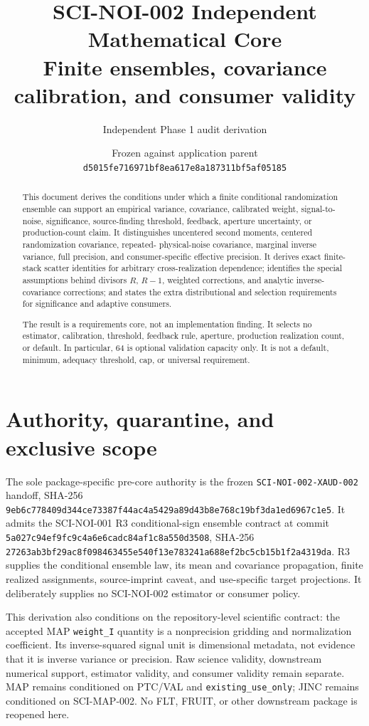 \documentclass[11pt]{article}
\title{SCI-NOI-002 Independent Mathematical Core\\
Finite ensembles, covariance calibration, and consumer validity}
\author{Independent Phase 1 audit derivation}
\date{Frozen against application parent\\
\texttt{d5015fe716971bf8ea617e8a187311bf5af05185}}
\begin{document}
\maketitle

\begin{abstract}
This document derives the conditions under which a finite conditional
randomization ensemble can support an empirical variance, covariance,
calibrated weight, signal-to-noise, significance, source-finding threshold,
feedback, aperture uncertainty, or production-count claim.  It distinguishes
uncentered second moments, centered randomization covariance, repeated-
physical-noise covariance, marginal inverse variance, full precision, and
consumer-specific effective precision.  It derives exact finite-stack scatter
identities for arbitrary cross-realization dependence; identifies the special
assumptions behind divisors $R$, $R-1$, weighted corrections, and analytic
inverse-covariance corrections; and states the extra distributional and
selection requirements for significance and adaptive consumers.

The result is a requirements core, not an implementation finding.  It selects
no estimator, calibration, threshold, feedback rule, aperture, production
realization count, or default.  In particular, 64 is optional validation
capacity only.  It is not a default, minimum, adequacy threshold, cap, or
universal requirement.
\end{abstract}

\section{Authority, quarantine, and exclusive scope}

The sole package-specific pre-core authority is the frozen
\texttt{SCI-NOI-002-XAUD-002} handoff, SHA-256
\texttt{9eb6c778409d344ce73387f44ac4a5429a89d43b8e768c19bf3da1ed6967c1e5}.
It admits the SCI-NOI-001 R3 conditional-sign ensemble contract at commit
\texttt{5a027c94ef9fc9c4a6e6cadc84af1c8a550d3508}, SHA-256
\texttt{27263ab3bf29ac8f098463455e540f13e783241a688ef2bc5cb15b1f2a4319da}.
R3 supplies the conditional ensemble law, its mean and covariance propagation,
finite realized assignments, source-imprint caveat, and use-specific target
projections.  It deliberately supplies no SCI-NOI-002 estimator or consumer
policy.

This derivation also conditions on the repository-level scientific contract:
the accepted MAP \texttt{weight\_I} quantity is a nonprecision gridding and
normalization coefficient.  Its inverse-squared signal unit is dimensional
metadata, not evidence that it is inverse variance or precision.  Raw science
validity, downstream numerical support, estimator validity, and consumer
validity remain separate.  MAP remains conditioned on PTC/VAL and
\texttt{existing\_use\_only}; JINC remains conditioned on SCI-MAP-002.  No
FLT, FRUIT, or other downstream package is reopened here.
\end{document}
